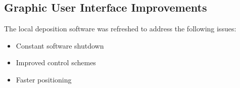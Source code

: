 


\subsection{Graphic User Interface Improvements}

The local deposition software was refreshed to address the following issues:

\begin{itemize}
\item Constant software shutdown
\item Improved control schemes
\item Faster positioning
\end{itemize}

